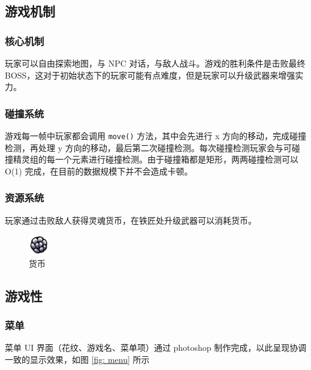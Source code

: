 \documentclass[12pt, twoside, a4paper]{article}
\newcommand{\inlinecode}[1]{\setlength{\fboxsep}{0.8mm} \colorbox{lightgray!40}{\texttt{#1}}}
\begin{document}
\subsection{游戏机制}

\subsubsection{核心机制} 玩家可以自由探索地图，与 NPC 对话，与敌人战斗。游戏的胜利条件是击败最终 BOSS，这对于初始状态下的玩家可能有点难度，但是玩家可以升级武器来增强实力。

\subsubsection{碰撞系统} 游戏每一帧中玩家都会调用 \inlinecode{move()} 方法，其中会先进行 x 方向的移动，完成碰撞检测，再处理 y 方向的移动，最后第二次碰撞检测。每次碰撞检测玩家会与可碰撞精灵组的每一个元素进行碰撞检测。由于碰撞箱都是矩形，两两碰撞检测可以 O(1) 完成，在目前的数据规模下并不会造成卡顿。

\subsubsection{资源系统} 玩家通过击败敌人获得灵魂货币，在铁匠处升级武器可以消耗货币。

\begin{figure}[h!]
    \centering
    \includegraphics[width=0.08\textwidth]{assets/report/coin.png}
    \caption{货币}
\end{figure}

\subsection{游戏性}

\subsubsection{菜单}

菜单 UI 界面（花纹、游戏名、菜单项）通过 photoshop 制作完成，以此呈现协调一致的显示效果，如图 \ref{fig: menu} 所示

\end{document}
